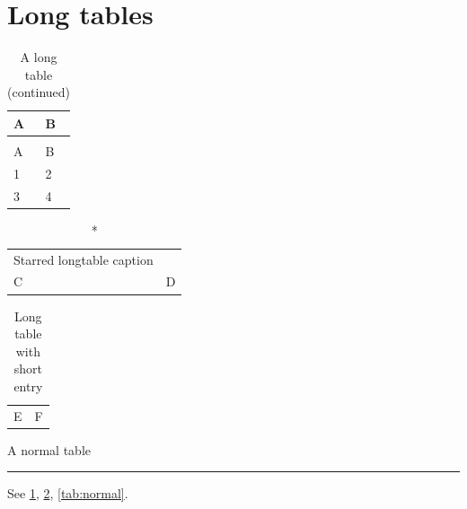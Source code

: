 \documentclass{article}
\begin{document}
\listoftables
\section{Long tables}
\begin{longtable}{ll}
\caption{A long table}\label{tab:lt1}\\
A & B\\ \hline
\endfirsthead
\caption[]{A long table (continued)}\\
A & B\\ \hline
\endhead
1 & 2\\
3 & 4\\
\end{longtable}
\begin{longtable}{ll}
\caption*{Starred longtable caption}\\
C & D\\
\end{longtable}
\begin{longtable}{ll}
\caption[Short LT]{Long table with short entry}\label{tab:lt3}\\
E & F\\
\end{longtable}
\begin{table}[htbp]
\caption{A normal table}\label{tab:normal}
\centering\rule{3cm}{1cm}
\end{table}
See \ref{tab:lt1}, \ref{tab:lt3}, \ref{tab:normal}.
\end{document}
